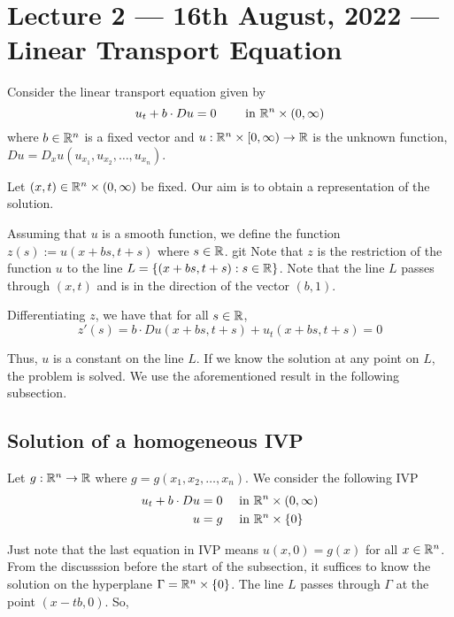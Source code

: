 \section{Lecture 2 --- 16th August, 2022 --- Linear Transport Equation}

Consider the linear transport equation given by 
$$u_t + b\cdot Du = 0 \qquad \text{ in } \mathbb R ^n \times (0, \infty)$$
where $b\in \mathbb R ^n$ is a fixed vector and $u: \mathbb R ^n \times [0, \infty ) \to \mathbb R$ is the unknown function, $Du = D_x u (u_{x_1}, u_{x_2} , \ldots , u_{x_n})$. 

Let $(x,t) \in \mathbb R ^n \times (0, \infty)$ be fixed. Our aim is to obtain a representation of the solution.

Assuming that $u$ is a smooth function, we define the function $z(s):= u(x+bs,t+s)$ where $s\in \mathbb R$.
git 
Note that $z$ is the restriction of the function $u$ to the line $L=\left\{ \left( x+bs, t+s  \right) : s \in \mathbb R \right\}$. Note that the line $L$ passes through $(x,t)$ and is in the direction of the vector $(b,1)$.

Differentiating $z$, we have that for all $s\in \mathbb R$, 
\begin{equation*}
    z'(s)=b\cdot Du (x+bs , t+s) + u_t (x+bs, t+s) = 0 
\end{equation*}

Thus, $u$ is a constant on the line $L$. If we know the solution at any point on $L$, the problem is solved. We use the aforementioned result in the following subsection.



\subsection{Solution of a homogeneous IVP}

Let $g: \mathbb R ^n \to \mathbb R$ where $g=g(x_1, x_2 ,\ldots , x_n)$. We consider the following IVP
\begin{align*}
    u_t + b\cdot Du &= 0 \quad \text{ in } \mathbb R ^n \times (0,\infty ) \\
    u &= g \quad \text{ in } \mathbb R^n \times \left\{ 0 \right\}
\end{align*}

Just note that the last equation in IVP means $u(x,0) = g(x)$ for all $x\in \mathbb R ^n$. From the discusssion before the start of the subsection, it suffices to know the solution on the hyperplane $\Gamma = \mathbb R ^n \times \left\{ 0 \right\}$. The line $L$ passes through $\Gamma$ at the point $(x-tb, 0 )$. So,

